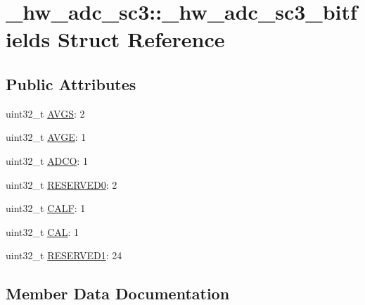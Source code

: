 \hypertarget{struct__hw__adc__sc3_1_1__hw__adc__sc3__bitfields}{}\section{\+\_\+hw\+\_\+adc\+\_\+sc3\+:\+:\+\_\+hw\+\_\+adc\+\_\+sc3\+\_\+bitfields Struct Reference}
\label{struct__hw__adc__sc3_1_1__hw__adc__sc3__bitfields}
\subsection*{Public Attributes}
\begin{DoxyCompactItemize}
\item 
uint32\+\_\+t \hyperlink{struct__hw__adc__sc3_1_1__hw__adc__sc3__bitfields_acd530315d997b7e8067f4a8135ee33c1}{A\+V\+GS}\+: 2
\item 
uint32\+\_\+t \hyperlink{struct__hw__adc__sc3_1_1__hw__adc__sc3__bitfields_a029515f723f30d9c4f3f133577e67a95}{A\+V\+GE}\+: 1
\item 
uint32\+\_\+t \hyperlink{struct__hw__adc__sc3_1_1__hw__adc__sc3__bitfields_ab78c6bbc05915c154b5c6428b379c54d}{A\+D\+CO}\+: 1
\item 
uint32\+\_\+t \hyperlink{struct__hw__adc__sc3_1_1__hw__adc__sc3__bitfields_ad08ac67386f43da951c582b90097af84}{R\+E\+S\+E\+R\+V\+E\+D0}\+: 2
\item 
uint32\+\_\+t \hyperlink{struct__hw__adc__sc3_1_1__hw__adc__sc3__bitfields_af56bcb1d3324d34ee0780e24b4335578}{C\+A\+LF}\+: 1
\item 
uint32\+\_\+t \hyperlink{struct__hw__adc__sc3_1_1__hw__adc__sc3__bitfields_a494982a33e12b2b825d1ca226a9d4a2c}{C\+AL}\+: 1
\item 
uint32\+\_\+t \hyperlink{struct__hw__adc__sc3_1_1__hw__adc__sc3__bitfields_a738e9ad7e008601c18703096b7637ac9}{R\+E\+S\+E\+R\+V\+E\+D1}\+: 24
\end{DoxyCompactItemize}


\subsection{Member Data Documentation}
